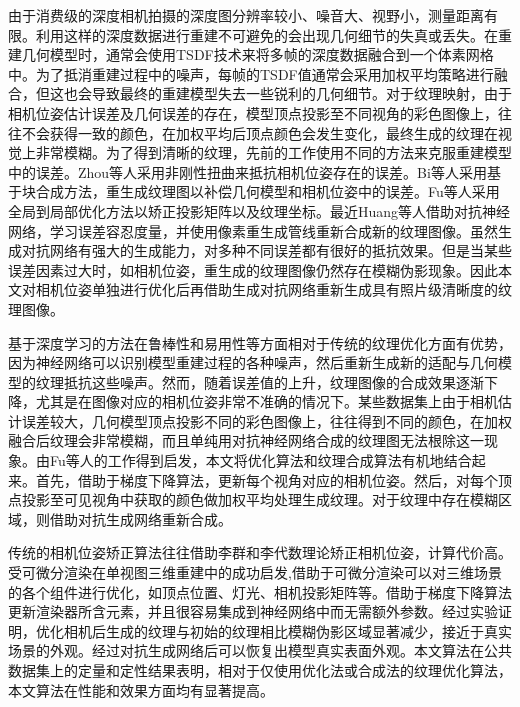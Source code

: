 由于消费级的深度相机拍摄的深度图分辨率较小、噪音大、视野小，测量距离有限。利用这样的深度数据进行重建不可避免的会出现几何细节的失真或丢失。在重建几何模型时，通常会使用TSDF技术来将多帧的深度数据融合到一个体素网格中。为了抵消重建过程中的噪声，每帧的TSDF值通常会采用加权平均策略进行融合，但这也会导致最终的重建模型失去一些锐利的几何细节。对于纹理映射，由于相机位姿估计误差及几何误差的存在，模型顶点投影至不同视角的彩色图像上，往往不会获得一致的颜色，在加权平均后顶点颜色会发生变化，最终生成的纹理在视觉上非常模糊。为了得到清晰的纹理，先前的工作使用不同的方法来克服重建模型中的误差。Zhou等人采用非刚性扭曲来抵抗相机位姿存在的误差。Bi等人采用基于块合成方法，重生成纹理图以补偿几何模型和相机位姿中的误差。Fu等人采用全局到局部优化方法以矫正投影矩阵以及纹理坐标。最近Huang等人借助对抗神经网络，学习误差容忍度量，并使用像素重生成管线重新合成新的纹理图像。虽然生成对抗网络有强大的生成能力，对多种不同误差都有很好的抵抗效果。但是当某些误差因素过大时，如相机位姿，重生成的纹理图像仍然存在模糊伪影现象。因此本文对相机位姿单独进行优化后再借助生成对抗网络重新生成具有照片级清晰度的纹理图像。\par
基于深度学习的方法在鲁棒性和易用性等方面相对于传统的纹理优化方面有优势，因为神经网络可以识别模型重建过程的各种噪声，然后重新生成新的适配与几何模型的纹理抵抗这些噪声。然而，随着误差值的上升，纹理图像的合成效果逐渐下降，尤其是在图像对应的相机位姿非常不准确的情况下。某些数据集上由于相机估计误差较大，几何模型顶点投影不同的彩色图像上，往往得到不同的颜色，在加权融合后纹理会非常模糊，而且单纯用对抗神经网络合成的纹理图无法根除这一现象。由Fu等人的工作得到启发，本文将优化算法和纹理合成算法有机地结合起来。首先，借助于梯度下降算法，更新每个视角对应的相机位姿。然后，对每个顶点投影至可见视角中获取的颜色做加权平均处理生成纹理。对于纹理中存在模糊区域，则借助对抗生成网络重新合成。\par
传统的相机位姿矫正算法往往借助李群和李代数理论矫正相机位姿，计算代价高。受可微分渲染在单视图三维重建中的成功启发,借助于可微分渲染可以对三维场景的各个组件进行优化，如顶点位置、灯光、相机投影矩阵等。借助于梯度下降算法更新渲染器所含元素，并且很容易集成到神经网络中而无需额外参数。经过实验证明，优化相机后生成的纹理与初始的纹理相比模糊伪影区域显著减少，接近于真实场景的外观。经过对抗生成网络后可以恢复出模型真实表面外观。本文算法在公共数据集上的定量和定性结果表明，相对于仅使用优化法或合成法的纹理优化算法，本文算法在性能和效果方面均有显著提高。


